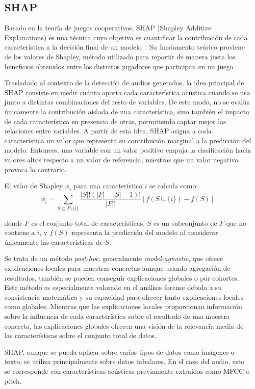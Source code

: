 \subsection{SHAP}
\label{subsubsec:eda_shap}

Basado en la teoría de juegos cooperativos, SHAP (Shapley Additive Explanations) es una técnica cuyo objetivo es cuantificar la contribución de cada característica a la decisión final de un modelo~\parencite{2017shap}. Su fundamento teórico proviene de los valores de Shapley, método utilizado para repartir de manera justa los beneficios obtenidos entre los distintos jugadores que participan en un juego.

Trasladado al contexto de la detección de audios generados, la idea principal de SHAP consiste en medir cuánto aporta cada característica acústica cuando se usa junto a distintas combinaciones del resto de variables. De este modo, no se evalúa únicamente la contribución aislada de una característica, sino también el impacto de cada característica en presencia de otras, permitiendo captar mejor las relaciones entre variables. A partir de esta idea, SHAP asigna a cada característica un valor que representa su contribución marginal a la predicción del modelo. Entonces, una variable con un valor positivo empuja la clasificación hacia valores altos respecto a un valor de referencia, mientras que un valor negativo provoca lo contrario.


El valor de Shapley $\phi_i$ para una característica $i$ se calcula como:
$$ \phi_i = \sum_{S \subseteq F \setminus \{i\}} \frac{|S|! (|F| - |S| - 1)!}{|F|!} [f(S \cup \{i\}) - f(S)] $$

donde $F$ es el conjunto total de características, $S$ es un subconjunto de $F$ que no contiene a $i$, y $f(S)$ representa la predicción del modelo al considerar únicamente las características de $S$.

Se trata de un método \textit{post-hoc}, generalmente \textit{model-agnostic}, que ofrece explicaciones locales para muestras concretas aunque usando agregación de resultados, también se pueden conseguir explicaciones globales o por cohortes. Este método es especialmente valorado en el análisis forense debido a su consistencia matemática y su capacidad para ofrecer tanto explicaciones locales como globales. Mientras que las explicaciones locales proporcionan información sobre la influencia de cada característica sobre el resultado de una muestra concreta, las explicaciones globales ofrecen una visión de la relevancia media de las características sobre el conjunto total de datos.

SHAP, aunque se pueda aplicar sobre varios tipos de datos como imágenes o texto, se utiliza principalmente sobre datos tabulares. En el caso del audio, esto se corresponde con características acústicas previamente extraídas como MFCC o pitch.